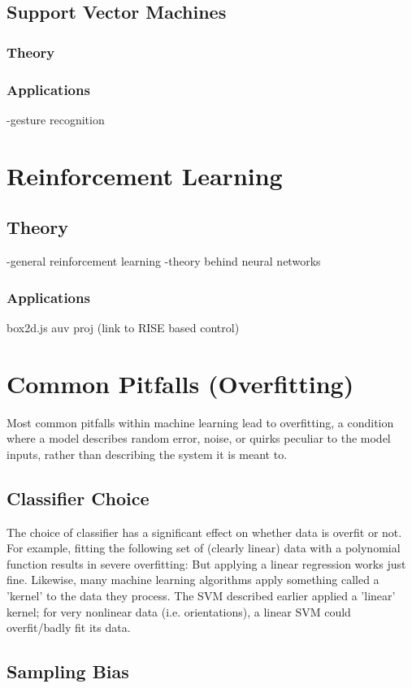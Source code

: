 \documentclass[11pt]{article}
\begin{document}
\subsection{Support Vector Machines}
\subsubsection{Theory}
\subsubsection{Applications}
-gesture recognition

\section{Reinforcement Learning}
\subsection{Theory}
-general reinforcement learning
-theory behind neural networks
\subsubsection{Applications}
box2d.js
auv proj (link to RISE based control)

\section{Common Pitfalls (Overfitting)}
Most common pitfalls within machine learning lead to overfitting, a condition where a model describes random error, noise, or quirks peculiar to the model inputs, rather than describing the system it is meant to.
\subsection{Classifier Choice}
The choice of classifier has a significant effect on whether data is overfit or not. For example, fitting the following set of (clearly linear) data with a polynomial function results in severe overfitting: 
But applying a linear regression works just fine. Likewise, many machine learning algorithms apply something called a 'kernel' to the data they process. The SVM described earlier applied a 'linear' kernel; for very nonlinear data (i.e. orientations), a linear SVM could overfit/badly fit its data.
\subsection{Sampling Bias}
\end{document}
